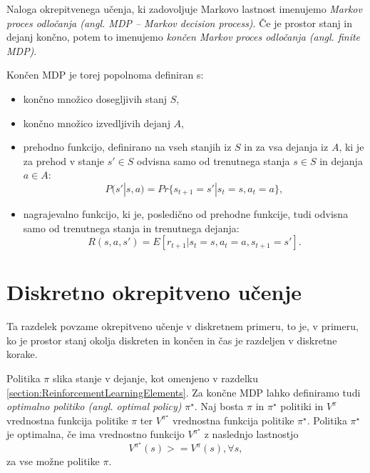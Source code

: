\documentclass[a4paper, oneside, 12pt]{report}
\begin{document}
Naloga okrepitvenega učenja, ki zadovoljuje Markovo lastnost imenujemo {\em Markov proces odločanja (angl. MDP -- Markov decision process)}. Če je prostor stanj in dejanj končno, potem to imenujemo {\em končen Markov proces odločanja (angl. finite MDP)}.

Končen MDP je torej popolnoma definiran s:
\begin{itemize}
\item končno množico dosegljivih stanj $S$,
\item končno množico izvedljivih dejanj $A$,
\item prehodno funkcijo, definirano na vseh stanjih iz $S$ in za vsa dejanja iz $A$, ki je za prehod v stanje $s' \in S$ odvisna samo od trenutnega stanja $s \in S$ in dejanja $a \in A$: 
\begin{equation}
P(s' | s, a) = Pr\{s_{t+1} = s' | s_t = s, a_t = a\},
\end{equation}
\item nagrajevalno funkcijo, ki je, posledično od prehodne funkcije, tudi odvisna samo od trenutnega stanja in trenutnega dejanja:
\begin{equation}
R(s, a, s') = E[r_{t+1} | s_t = s, a_t = a, s_{t+1} = s'].
\end{equation}
\end{itemize}

\section{Diskretno okrepitveno učenje}
Ta razdelek povzame okrepitveno učenje \cite{ReinforcementLearningAnIntroduction} v diskretnem primeru, to je, v primeru, ko je prostor stanj okolja diskreten in končen in čas je razdeljen v diskretne korake.

Politika $\pi$ slika stanje v dejanje, kot omenjeno v razdelku \ref{section:ReinforcementLearningElements}. Za končne MDP lahko definiramo tudi {\em optimalno politiko (angl. optimal policy)} $\pi^\star$. Naj bosta $\pi$ in $\pi^\star$ politiki in $V^\pi$ vrednostna funkcija politike $\pi$ ter $V^{\pi^\star}$ vrednostna funkcija politike $\pi^\star$. Politika $\pi^\star$ je optimalna, če ima vrednostno funkcijo  $V^{\pi^\star}$ z naslednjo lastnostjo
\begin{equation}
V^{\pi^\star}(s) >= V^\pi(s), \forall s,
\end{equation}
za vse možne politike $\pi$.
\end{document}
